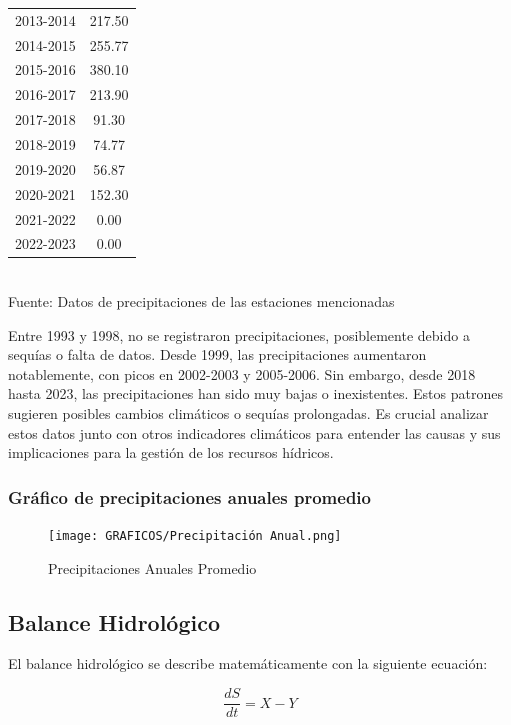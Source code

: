 \documentclass{article} %
\begin{document}
\begin{table}[ht]
\begin{tabular}{|c|c|}
        2013-2014 & 217.50 \\
        2014-2015 & 255.77 \\
        2015-2016 & 380.10 \\
        2016-2017 & 213.90 \\
        2017-2018 & 91.30 \\
        2018-2019 & 74.77 \\
        2019-2020 & 56.87 \\
        2020-2021 & 152.30 \\
        2021-2022 & 0.00 \\
        2022-2023 & 0.00 \\
        \hline
    \end{tabular}
    \label{tab:precipitaciones_anuales}
    \vspace{0.2cm}
    \\Fuente: Datos de precipitaciones de las estaciones mencionadas
\end{table}

Entre 1993 y 1998, no se registraron precipitaciones, posiblemente debido a sequías o falta de datos. Desde 1999, las precipitaciones aumentaron notablemente, con picos en 2002-2003 y 2005-2006. Sin embargo, desde 2018 hasta 2023, las precipitaciones han sido muy bajas o inexistentes. Estos patrones sugieren posibles cambios climáticos o sequías prolongadas. Es crucial analizar estos datos junto con otros indicadores climáticos para entender las causas y sus implicaciones para la gestión de los recursos hídricos.
\newpage
\subsubsection{Gráfico de precipitaciones anuales promedio}
\begin{figure}[h!]
    \centering
    \texttt{[image: GRAFICOS/Precipitación Anual.png]}
    \caption{Precipitaciones Anuales Promedio}
    \label{fig:precipitaciones_anuales}
\end{figure}


\newpage
\subsection{Balance Hidrológico}

El balance hidrológico se describe matemáticamente con la siguiente ecuación:

\begin{equation}
    \frac{dS}{dt} = X - Y
\end{equation}
\end{document}
